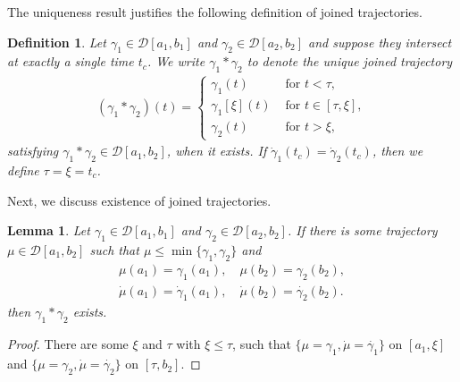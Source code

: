 \documentclass[a4paper]{article}
\theoremstyle{definition}
\newtheorem{remark}{Remark}
\theoremstyle{plain}
\newtheorem{define}{Definition\hspace{0.25em}\ignorespaces}
\newtheorem{lemma}{Lemma\hspace{0.25em}\ignorespaces}
\begin{document}

The uniqueness result justifies the following definition of joined trajectories.

\begin{define}
  Let $\gamma_{1} \in \mathcal{D}[a_{1}, b_{1}]$ and
  $\gamma_{2} \in \mathcal{D}[a_{2}, b_{2}]$ and suppose they intersect at
  exactly a single time $t_{c}$. We write $\gamma_{1} * \gamma_{2}$ to denote
  the unique \emph{joined trajectory}
  \begin{align}
    (\gamma_{1} * \gamma_{2})(t) =
    \begin{cases}
      \gamma_{1}(t) & \text{ for } t < \tau , \\
      \gamma_{1}[\xi](t) & \text{ for } t \in [\tau, \xi] , \\
      \gamma_{2}(t) & \text{ for } t > \xi ,
    \end{cases}
  \end{align}
  satisfying $\gamma_{1} * \gamma_{2} \in \mathcal{D}[a_{1}, b_{2}]$, when it exists.
  If $\dot{\gamma}_{1}(t_{c}) = \dot{\gamma}_{2}(t_{c})$, then we define $\tau=\xi=t_{c}$.
\end{define}

Next, we discuss existence of joined trajectories.

\begin{lemma}
  Let $\gamma_{1} \in \mathcal{D}[a_{1}, b_{1}]$ and
  $\gamma_{2} \in \mathcal{D}[a_{2},b_{2}]$. If there is some trajectory
  $\mu \in \mathcal{D}[a_{1}, b_{2}]$ such that
  $\mu \leq \min\{\gamma_{1}, \gamma_{2}\}$ and
  \begin{align*}
    \mu(a_{1}) = \gamma_{1}(a_{1}), \quad \mu(b_{2}) = \gamma_{2}(b_{2}), \\
    \dot{\mu}(a_{1}) = \dot{\gamma}_{1}(a_{1}), \quad \dot{\mu}(b_{2}) = \dot{\gamma_{2}}(b_{2}).
  \end{align*}
  then $\gamma_{1} * \gamma_{2}$ exists.
\end{lemma}
\begin{proof}
  There are some $\xi$ and $\tau$ with $\xi \leq \tau$, such that
  $\{ \mu = \gamma_{1}, \dot{\mu} = \dot{\gamma_{1}} \}$ on $[a_{1}, \xi]$ and
  $\{ \mu = \gamma_{2}, \dot{\mu} = \dot{\gamma_{2}} \}$ on $[\tau, b_{2}]$.
\end{proof}
\end{document}
